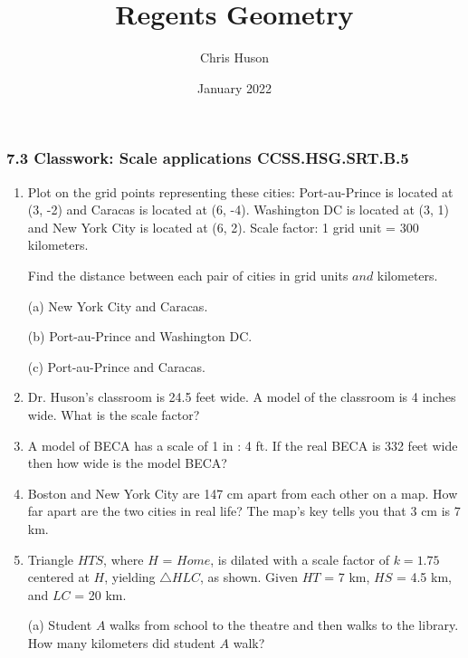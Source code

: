 \documentclass[12pt, twoside]{article}
\title{Regents Geometry}
\author{Chris Huson}
\date{January 2022}
\begin{document}
\subsubsection*{7.3 Classwork: Scale applications \hfill CCSS.HSG.SRT.B.5}
\begin{enumerate}

\item Plot on the grid points representing these cities: Port-au-Prince is located at (3, -2) and Caracas is located at (6, -4). Washington DC is located at (3, 1) and New York City is located at (6, 2). Scale factor: 1 grid unit = 300 kilometers.

Find the distance between each pair of cities in grid units $and$ kilometers.

(a) New York City and Caracas.

(b) Port-au-Prince and Washington DC.

(c) Port-au-Prince and Caracas.

\begin{multicols}{2}
\end{multicols}

\item Dr. Huson's classroom is 24.5 feet wide. A model of the classroom is 4 inches wide. What is the scale factor?\vspace{2cm}

\item A model of BECA has a scale of 1 in : 4 ft. If the real BECA is 332 feet wide then how wide is the model BECA?\vspace{2cm}

\item Boston and New York City are 147 cm apart from each other on a map. How far apart are the two cities in real life? The map's key tells you that 3 cm is 7 km.

\newpage
\item Triangle $HTS$, where $H$ = $Home$, is dilated with a scale factor of $k=1.75$ centered at $H$, yielding $\triangle HLC$, as shown. Given $HT$ = 7 km, $HS$ = 4.5 km, and $LC$ = 20 km.

(a) Student $A$ walks from school to the theatre and then walks to the library. How many kilometers did student $A$ walk?


\end{enumerate}
\end{document}
